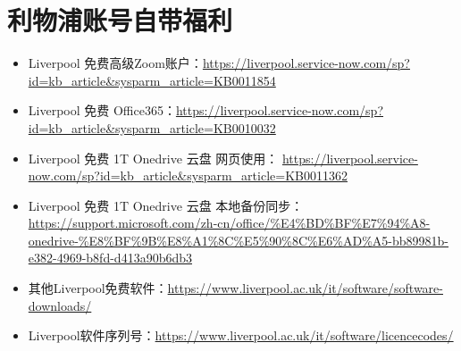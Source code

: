 \section{利物浦账号自带福利}
\begin{itemize}
    \item Liverpool 免费高级Zoom账户：\url{https://liverpool.service-now.com/sp?id=kb_article&sysparm_article=KB0011854}
    \item Liverpool 免费 Office365：\url{https://liverpool.service-now.com/sp?id=kb_article&sysparm_article=KB0010032}
    \item Liverpool 免费 1T Onedrive 云盘 网页使用： \url{https://liverpool.service-now.com/sp?id=kb_article&sysparm_article=KB0011362}
    \item Liverpool 免费 1T Onedrive 云盘 本地备份同步： \url{https://support.microsoft.com/zh-cn/office/%E4%BD%BF%E7%94%A8-onedrive-%E8%BF%9B%E8%A1%8C%E5%90%8C%E6%AD%A5-bb89981b-e382-4969-b8fd-d413a90b6db3}
    \item 其他Liverpool免费软件：\url{https://www.liverpool.ac.uk/it/software/software-downloads/}
    \item Liverpool软件序列号：\url{https://www.liverpool.ac.uk/it/software/licencecodes/}
\end{itemize}